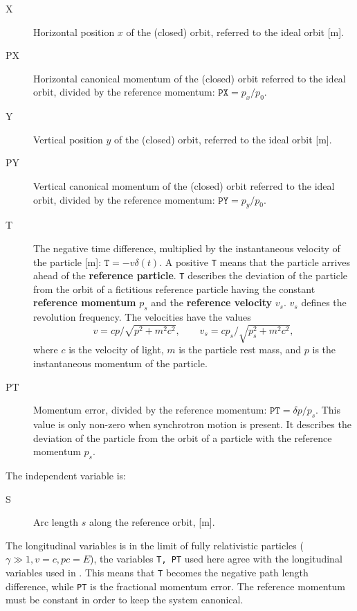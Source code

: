 \begin{description}
\item[X]
  Horizontal position $x$ of the (closed) orbit,
  referred to the ideal orbit [m].

\item[PX]
  Horizontal canonical momentum of the (closed) orbit referred 
  to the ideal orbit, divided by the reference momentum:
  $\mathtt{PX} = p_x / p_0$.

\item[Y]
  Vertical position $y$ of the (closed) orbit,
  referred to the ideal orbit [m].

\item[PY]
  Vertical canonical momentum of the (closed) orbit referred 
  to the ideal orbit, divided by the reference momentum:
  $\mathtt{PY} = p_y / p_0$.

\item[T]
  The negative time difference, 
  multiplied by the instantaneous velocity of the particle [m]:
  $\mathtt{T} = - v \delta(t)$.
  A positive \texttt{T} means that the particle arrives ahead of the 
  \textbf{reference particle}.
  \texttt{T} describes the deviation of the particle from the orbit of 
  a fictitious reference particle having the constant 
  \textbf{reference momentum} $p_s$ and the 
  \textbf{reference velocity} $v_s$.
  $v_s$ defines the revolution frequency.
  The velocities have the values 
  \[
  v = c p / \sqrt{p^2 + m^2 c^2}, \qquad
  v_s = c p_s / \sqrt{p_s^2 + m^2 c^2},
  \]
  where $c$ is the velocity of light, $m$ is the particle rest mass, 
  and $p$ is the instantaneous momentum of the particle.

\item[PT]
  Momentum error, divided by the reference momentum:
  $\mathtt{PT} = \delta p / p_s$.
  This value is only non-zero when synchrotron motion is present.
  It describes the deviation of the particle from the orbit of a
  particle with the reference momentum $p_s$.
\end{description}

The independent variable is:
\begin{description}
\item[S]
  Arc length $s$ along the reference orbit, [m].
\end{description}

The longitudinal variables is in the limit of fully relativistic particles
($\gamma \gg 1, v = c, p c = E$),
the variables \texttt{T, PT} used here agree with the longitudinal variables
used in .
This means that \texttt{T} becomes the negative path length difference,
while \texttt{PT} is the fractional momentum error.
The reference momentum must be constant in order to keep the system 
canonical.

